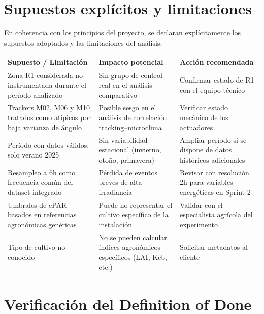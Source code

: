 \documentclass[12pt, a4paper]{article}
\begin{document}
\section{Supuestos explícitos y limitaciones}

En coherencia con los principios del proyecto, se declaran explícitamente los supuestos adoptados y las limitaciones del análisis:

\begin{longtable}{p{5cm} p{5cm} p{4.5cm}}
\toprule
\textbf{Supuesto / Limitación} & \textbf{Impacto potencial} & \textbf{Acción recomendada} \\
\midrule
\endhead
Zona R1 considerada no instrumentada durante el período analizado &
Sin grupo de control real en el análisis comparativo &
Confirmar estado de R1 con el equipo técnico \\[6pt]
Trackers M02, M06 y M10 tratados como atípicos por baja varianza de ángulo &
Posible sesgo en el análisis de correlación tracking--microclima &
Verificar estado mecánico de los actuadores \\[6pt]
Período con datos válidos: solo verano 2025 &
Sin variabilidad estacional (invierno, otoño, primavera) &
Ampliar período si se dispone de datos históricos adicionales \\[6pt]
Resampleo a 6h como frecuencia común del dataset integrado &
Pérdida de eventos breves de alta irradiancia &
Revisar con resolución 2h para variables energéticas en Sprint 2 \\[6pt]
Umbrales de ePAR basados en referencias agronómicas genéricas &
Puede no representar el cultivo específico de la instalación &
Validar con el especialista agrícola del experimento \\[6pt]
Tipo de cultivo no conocido &
No se pueden calcular índices agronómicos específicos (LAI, Kcb, etc.) &
Solicitar metadatos al cliente \\
\bottomrule
\end{longtable}

\section{Verificación del Definition of Done}
\end{document}
